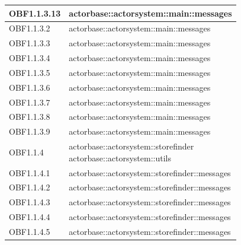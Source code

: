 \documentclass{scalatekids-article}
\begin{document}
\begin{longtable}[H]{|p{6cm}|p{11cm}|}
\hline
OBF1.1.3.13 & \multiLineCell[t]{actorbase::actorsystem::main::messages\\}\\
\hline
OBF1.1.3.2 & \multiLineCell[t]{actorbase::actorsystem::main::messages\\}\\
\hline
OBF1.1.3.3 & \multiLineCell[t]{actorbase::actorsystem::main::messages\\}\\
\hline
OBF1.1.3.4 & \multiLineCell[t]{actorbase::actorsystem::main::messages\\}\\
\hline
OBF1.1.3.5 & \multiLineCell[t]{actorbase::actorsystem::main::messages\\}\\
\hline
OBF1.1.3.6 & \multiLineCell[t]{actorbase::actorsystem::main::messages\\}\\
\hline
OBF1.1.3.7 & \multiLineCell[t]{actorbase::actorsystem::main::messages\\}\\
\hline
OBF1.1.3.8 & \multiLineCell[t]{actorbase::actorsystem::main::messages\\}\\
\hline
OBF1.1.3.9 & \multiLineCell[t]{actorbase::actorsystem::main::messages\\}\\
\hline
OBF1.1.4 & \multiLineCell[t]{actorbase::actorsystem::storefinder\\actorbase::actorsystem::utils\\}\\
\hline
OBF1.1.4.1 & \multiLineCell[t]{actorbase::actorsystem::storefinder::messages\\}\\
\hline
OBF1.1.4.2 & \multiLineCell[t]{actorbase::actorsystem::storefinder::messages\\}\\
\hline
OBF1.1.4.3 & \multiLineCell[t]{actorbase::actorsystem::storefinder::messages\\}\\
\hline
OBF1.1.4.4 & \multiLineCell[t]{actorbase::actorsystem::storefinder::messages\\}\\
\hline
OBF1.1.4.5 & \multiLineCell[t]{actorbase::actorsystem::storefinder::messages\\}\\

\end{longtable}
\end{document}
